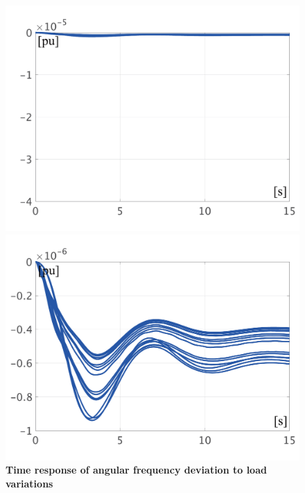 \documentclass[tombow,dvipdfmx]{corona-a5-1.1}
\begin{document}
\begin{figure}[t]
{\begin{minipage}{0.49\linewidth}
    \centering
    \includegraphics[width = 1.0\linewidth]{figs/WavrWagc}
    \medskip
  \end{minipage}
  \begin{minipage}{0.49\linewidth}
    \centering
    \includegraphics[width = 1.0\linewidth]{figs/WavrWagcL}
    \medskip
  \end{minipage}
  }
  \medskip
  \caption{\textbf{Time response of angular frequency deviation to load variations}}
  \label{fig:omegasAGC}
\medskip
\end{figure}
\end{document}
